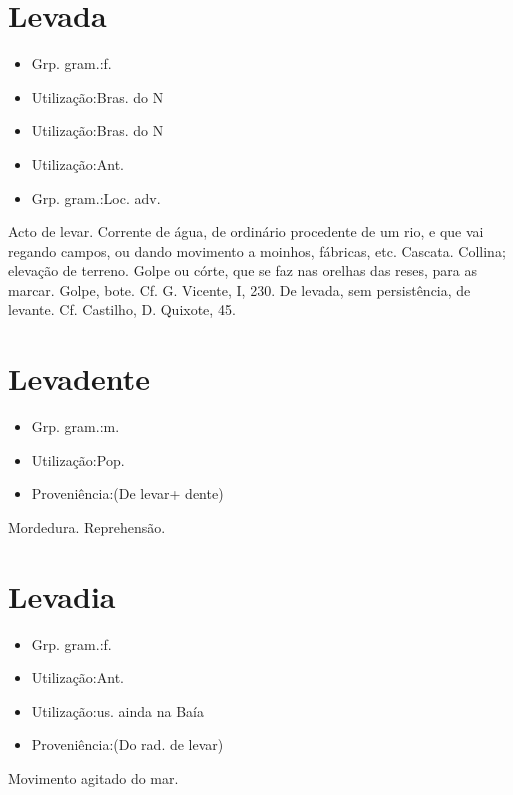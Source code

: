 \section{Levada}
\begin{itemize}
\item {Grp. gram.:f.}
\end{itemize}
\begin{itemize}
\item {Utilização:Bras. do N}
\end{itemize}
\begin{itemize}
\item {Utilização:Bras. do N}
\end{itemize}
\begin{itemize}
\item {Utilização:Ant.}
\end{itemize}
\begin{itemize}
\item {Grp. gram.:Loc. adv.}
\end{itemize}
Acto de levar.
Corrente de água, de ordinário procedente de um rio, e que vai regando campos, ou dando movimento a moinhos, fábricas, etc.
Cascata.
Collina; elevação de terreno.
Golpe ou córte, que se faz nas orelhas das reses, para as marcar.
Golpe, bote. Cf. G. Vicente, I, 230.
\textunderscore De levada\textunderscore , sem persistência, de levante. Cf. Castilho, \textunderscore D. Quixote\textunderscore , 45.
\section{Levadente}
\begin{itemize}
\item {Grp. gram.:m.}
\end{itemize}
\begin{itemize}
\item {Utilização:Pop.}
\end{itemize}
\begin{itemize}
\item {Proveniência:(De \textunderscore levar\textunderscore  + \textunderscore dente\textunderscore )}
\end{itemize}
Mordedura.
Reprehensão.
\section{Levadia}
\begin{itemize}
\item {Grp. gram.:f.}
\end{itemize}
\begin{itemize}
\item {Utilização:Ant.}
\end{itemize}
\begin{itemize}
\item {Utilização:us. ainda na Baía}
\end{itemize}
\begin{itemize}
\item {Proveniência:(Do rad. de \textunderscore levar\textunderscore )}
\end{itemize}
Movimento agitado do mar.
